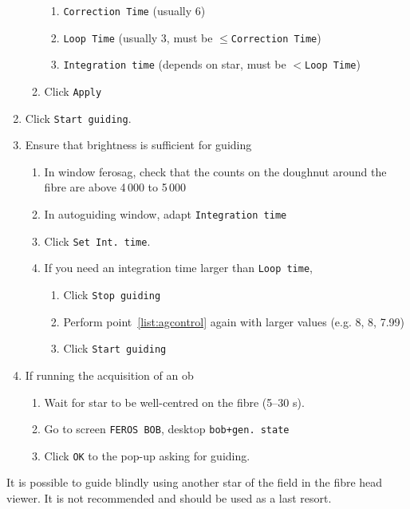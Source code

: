 \documentclass[11pt,fleqn,a4paper]{book}
\begin{document}
\begin{enumerate}
\begin{enumerate}
            \begin{enumerate}
                \item \texttt{Correction Time} (usually 6)
                \item \texttt{Loop Time} (usually 3, must be $\le $\texttt{Correction Time})
                \item \texttt{Integration time} (depends on star, must be $< $\texttt{Loop Time})
            \end{enumerate}
        \item Click \texttt{Apply}
    \end{enumerate}
    \item Click \texttt{Start guiding}.
    \item Ensure that brightness is sufficient for guiding
    \begin{enumerate}
        \item In window \gls{ferosag}, check that the counts on the doughnut around the fibre are above 4\,000 to 5\,000
        \item In \gls{autoguiding} window, adapt \texttt{Integration time}
        \item Click \texttt{Set Int. time}. 
        \item If you need an integration time larger than \texttt{Loop time},
            \begin{enumerate}
                \item Click \texttt{Stop guiding}
                \item Perform point~\ref{list:agcontrol} again with larger values (e.g. 8, 8, 7.99)
                \item Click \texttt{Start guiding}
            \end{enumerate}
    \end{enumerate}
    \item If running the \gls{acquisition} of an \gls{ob}
    \begin{enumerate}
        \item Wait for star to be well-centred on the fibre (5--30 s).
        \item Go to screen \texttt{FEROS BOB}, \gls{desktop} \texttt{bob+gen. state}
        \item Click \texttt{OK} to the pop-up asking for guiding.
    \end{enumerate}
\end{enumerate}

It is possible to guide blindly using another star of the field in the fibre head viewer.  It is not recommended and should be used as a last resort.
\end{document}
